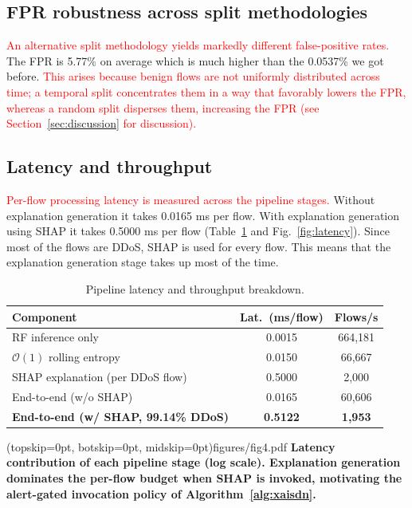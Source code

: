 \documentclass{ieeeaccess}
\begin{document}
\subsection{FPR robustness across split methodologies}
\textcolor{red}{An alternative split methodology yields markedly different false-positive rates.} The FPR is 5.77\% on average which is much higher than the 0.0537\% we got before. \textcolor{red}{This arises because benign flows are not uniformly distributed across time; a temporal split concentrates them in a way that favorably lowers the FPR, whereas a random split disperses them, increasing the FPR (see Section~\ref{sec:discussion} for discussion).}

\subsection{Latency and throughput}
\textcolor{red}{Per-flow processing latency is measured across the pipeline stages.} Without explanation generation it takes 0.0165 ms per flow. With explanation generation using SHAP it takes 0.5000 ms per flow (Table~\ref{tab:latency} and Fig.~\ref{fig:latency}). Since most of the flows are DDoS, SHAP is used for every flow. This means that the explanation generation stage takes up most of the time.

\begin{table}
\caption{Pipeline latency and throughput breakdown.}
\centering
\label{tab:latency}
\small
\setlength{\tabcolsep}{4pt}
\begin{tabular}{@{}lcc@{}}
\toprule
\textbf{Component} & \textbf{Lat.\ (ms/flow)} & \textbf{Flows/s} \\
\midrule
RF inference only & 0.0015 & 664,181 \\
$\mathcal{O}(1)$ rolling entropy & 0.0150 & 66,667 \\
SHAP explanation (per DDoS flow) & 0.5000 & 2,000 \\
End-to-end (w/o SHAP) & 0.0165 & 60,606 \\
\textbf{End-to-end (w/ SHAP, 99.14\% DDoS)} & \textbf{0.5122} & \textbf{1,953} \\
\bottomrule
\end{tabular}
\end{table}

\Figure[t!](topskip=0pt, botskip=0pt, midskip=0pt){figures/fig4.pdf}
{ \textbf{Latency contribution of each pipeline stage (log scale). Explanation generation dominates the per-flow budget when SHAP is invoked, motivating the alert-gated invocation policy of Algorithm~\ref{alg:xaisdn}.}\label{fig:latency}}
\end{document}
